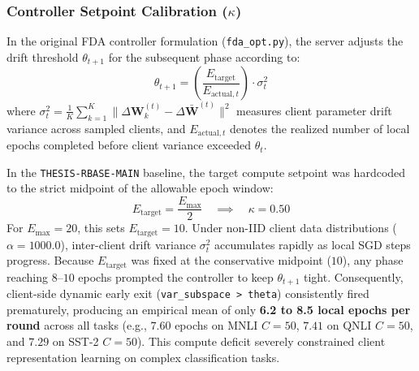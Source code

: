 \documentclass[10pt,a4paper]{article}
\begin{document}
\subsubsection{\texorpdfstring{Controller Setpoint Calibration ($\kappa$)}{Controller Setpoint Calibration (kappa)}}
In the original FDA controller formulation (\texttt{fda\_opt.py}), the server adjusts the drift threshold $\theta_{t+1}$ for the subsequent phase according to:
\begin{equation}
\theta_{t+1} = \left( \frac{E_{\text{target}}}{E_{\text{actual}, t}} \right) \cdot \sigma^2_t
\label{eq:theta_update}
\end{equation}
where $\sigma^2_t = \frac{1}{K} \sum_{k=1}^K \|\Delta \mathbf{W}_k^{(t)} - \Delta \bar{\mathbf{W}}^{(t)}\|^2$ measures client parameter drift variance across sampled clients, and $E_{\text{actual}, t}$ denotes the realized number of local epochs completed before client variance exceeded $\theta_t$.

In the \texttt{THESIS-RBASE-MAIN} baseline, the target compute setpoint was hardcoded to the strict midpoint of the allowable epoch window:
\begin{equation}
E_{\text{target}} = \frac{E_{\max}}{2} \quad \implies \quad \kappa = 0.50
\end{equation}
For $E_{\max} = 20$, this sets $E_{\text{target}} = 10$.
Under non-IID client data distributions ($\alpha = 1000.0$), inter-client drift variance $\sigma^2_t$ accumulates rapidly as local SGD steps progress.
Because $E_{\text{target}}$ was fixed at the conservative midpoint ($10$), any phase reaching $8$--$10$ epochs prompted the controller to keep $\theta_{t+1}$ tight.
Consequently, client-side dynamic early exit (\texttt{var\_subspace > theta}) consistently fired prematurely, producing an empirical mean of only \textbf{6.2 to 8.5 local epochs per round} across all tasks (e.g., $7.60$ epochs on MNLI $C=50$, $7.41$ on QNLI $C=50$, and $7.29$ on SST-2 $C=50$).
This compute deficit severely constrained client representation learning on complex classification tasks.
\end{document}
